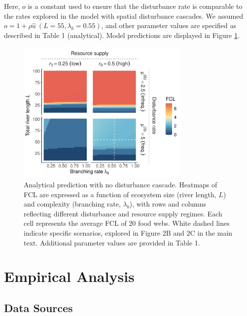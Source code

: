 \documentclass[11pt, class=article, crop=false]{standalone}
\theoremstyle{definition}
\begin{document}
Here, $o$ is a constant used to ensure that the disturbance rate is comparable to the rates explored in the model with spatial disturbance cascades.
We assumed $o = 1 + \rho \hat{u}~(L = 55, \lambda_b = 0.55)$, and other parameter values are specified as described in Table 1 (analytical).
Model predictions are displayed in Figure \ref{fig:no-cascade}.

\begin{figure}
\centering
\includegraphics[width=0.75\textwidth]{fig_theo_rho0.pdf}
\caption{Analytical prediction with no disturbance cascade. Heatmaps of
FCL are expressed as a function of ecosystem size (river length, \(L\))
and complexity (branching rate, \(\lambda_b\)), with rows and columns
reflecting different disturbance and resource supply regimes. Each cell
represents the average FCL of 20 food webs. White dashed lines indicate
specific scenarios, explored in Figure 2B and 2C in the main text.
Additional parameter values are provided in Table 1.}
\label{fig:no-cascade}
\end{figure}

\newpage

\section{Empirical Analysis}

\subsection{Data Sources}
\end{document}
